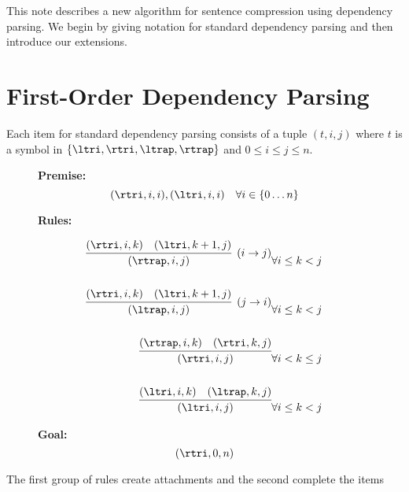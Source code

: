 \documentclass{article}
\begin{document}

This note describes a new algorithm for sentence compression using dependency parsing. We begin by giving notation for standard dependency parsing and then introduce our extensions.



\section{First-Order Dependency Parsing }

Each item for standard dependency parsing consists of a tuple $(t, i, j)$ where $t$ is a symbol in $\{\ltri,\rtri, \ltrap, \rtrap \}$  and $0\leq i \leq j \leq n$.


\begin{figure}\centering

  \noindent \textbf{Premise:}
  \[(\rtri, i,i), (\ltri, i,i)\ \ \ \forall i \in \{0 \ldots n\}\]


  \noindent\textbf{Rules:}

\begin{eqnarray*}
  \infer[(i \rightarrow j)]{(\rtrap, i,j)}{(\rtri, i,k)  &  (\ltri, k+1, j) } & \forall i\leq k < j \\\\
  \infer[(j \rightarrow i)]{(\ltrap, i,j)}{(\rtri, i,k)  &  (\ltri, k+1, j) } & \forall i\leq k < j \\\\
  \infer{(\rtri, i,j)}{(\rtrap, i,k)  &  (\rtri, k, j) }    &  \forall i< k \leq j \\\\
  \infer{(\ltri, i,j)}{(\ltri, i,k)  &  (\ltrap, k, j) }  & \forall i\leq k < j
\end{eqnarray*}

\noindent \textbf{Goal:}\[ (\rtri, 0,n)\]
\end{figure}
The first group of rules create attachments and the second complete the items


\end{document}

